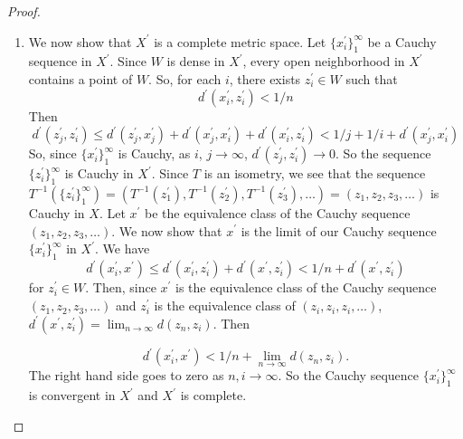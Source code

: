 \documentclass[12pt]{article}
\newcommand{\xprime}{X^\prime}
\begin{document}
\begin{enumerate}
\begin{mybox}
\begin{proof}
\begin{enumerate}
            \vspace*{3mm}
            \item We now show that $\xprime$ is a complete
            metric space. Let $\{x_i^\prime\}_1^\infty$
            be a Cauchy sequence in $\xprime$. Since
            $W$ is dense in $\xprime$, every open
            neighborhood in $\xprime$ contains a point of $W$.
            So, for each $i$,
            there exists $z_i^\prime\in W$ such that
            $$d^\prime(x_i^\prime,z_i^\prime)<1/n$$
            Then
            $$d^\prime(z_j^\prime,z_i^\prime)\leq
            d^\prime(z_j^\prime,x_j^\prime)+
            d^\prime(x_j^\prime,x_i^\prime)+
            d^\prime(x_i^\prime,z_i^\prime)<
            1/j+1/i+
            d^\prime(x_j^\prime,x_i^\prime)$$
            So, since $\{x_i^\prime\}_1^\infty$
            is Cauchy, as $i$, $j\to \infty$,
            $d^\prime(z_j^\prime,z_i^\prime)\to
            0$. So the sequence
            $\{z_i^\prime\}_1^\infty$ is Cauchy in $\xprime$.
            Since $T$ is an isometry,
            we see that the sequence
            $T^{-1}(\{z_i^\prime\}_1^\infty)=(
                T^{-1}(z_1^\prime),T^{-1}(z_2^\prime),
                T^{-1}(z_3^\prime),
                \ldots
            )=(z_1,z_2,z_3,\ldots)$ is Cauchy in $X$.
            Let $x^\prime$ be the equivalence class of
            the Cauchy sequence $(z_1,z_2,z_3,\ldots)$.
            We now show that $x^\prime$ is the limit
            of our Cauchy sequence
            $\{x_i^\prime\}_1^\infty$ in $\xprime$.
            We have
            $$d^\prime(x_i^\prime,x^\prime)
            \leq d^\prime(x_i^\prime,z_i^\prime)+
            d^\prime(x^\prime,z_i^\prime)
            <1/n+d^\prime(x^\prime,z_i^\prime)$$
            for $z_i^\prime\in W$. Then, since
            $x^\prime$ is the equivalence class of
            the Cauchy sequence $(z_1,z_2,z_3,\ldots)$
            and $z_i^\prime$ is the equivalence
            class of $(z_i,z_i,z_i,\ldots)$,
            $d^\prime(x^\prime,z_i^\prime)=
            \lim_{n\to\infty}{d(z_n,z_i)}$. Then

            $$d^\prime(x_i^\prime,x^\prime)<
            1/n+\lim_{n\to\infty}{d(z_n,z_i)}.$$
            The right hand side goes to zero as $n,i\to
            \infty$. So the Cauchy sequence
            $\{x_i^\prime\}_1^\infty$ is convergent in
            $\xprime$ and $\xprime$ is complete.


\end{enumerate}
\end{proof}
\end{mybox}
\end{enumerate}
\end{document}
